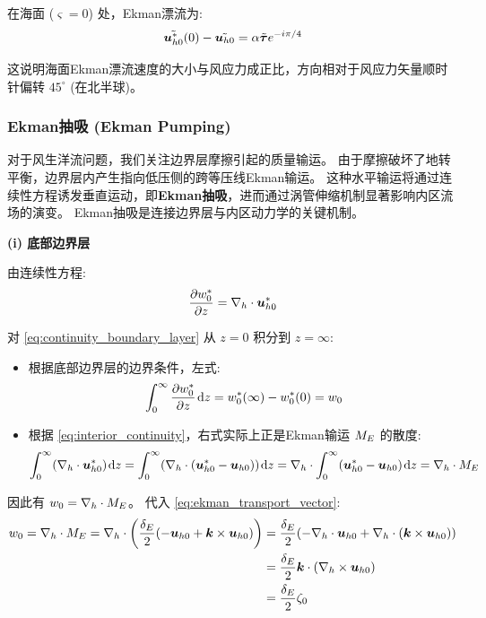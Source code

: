在海面 ($\varsigma=0$) 处，Ekman漂流为:
\begin{equation}
    \tilde{\bm{u}_{h0}^*}(0) - \tilde{\bm{u}_{h0}} = \alpha \tilde{{\bm{\tau}}} e^{-i \pi/4}
    \label{eq:surface_velocity_boundary_top}
\end{equation}

这说明海面Ekman漂流速度的大小与风应力成正比，方向相对于风应力矢量顺时针偏转 $45^\circ$ (在北半球)。

\subsubsection{Ekman抽吸 (Ekman Pumping)}

对于风生洋流问题，我们关注边界层摩擦引起的质量输运。
由于摩擦破坏了地转平衡，边界层内产生指向低压侧的跨等压线Ekman输运。
这种水平输运将通过连续性方程诱发垂直运动，即\textbf{Ekman抽吸}，进而通过涡管伸缩机制显著影响内区流场的演变。
Ekman抽吸是连接边界层与内区动力学的关键机制。

\textbf{(i) 底部边界层}

由连续性方程:
\begin{equation}
    \pde{\flayer{w_0}}{z} = \nabla_h \cdot \flayer{\vel_{h0}}
    \label{eq:continuity_boundary_layer}
\end{equation}

对 \eqref{eq:continuity_boundary_layer} 从 $z = 0$ 积分到 $z = \infty$:
\begin{itemize}
    \item 根据底部边界层的边界条件，左式:
    \begin{equation*}
        \int_0^\infty \pde{\flayer{w_0}}{z} \dd{z} = \flayer{w_0}(\infty) - \flayer{w_0}(0) = w_0
    \end{equation*}

    \item 根据 \eqref{eq:interior_continuity}，右式实际上正是Ekman输运 $M_E$ 的散度:
    \begin{equation*}
        \int_0^\infty (\nabla_h \cdot \bm{u}_{h0}^*) \mkern2mu \mathrm{d} z = \int_0^\infty (\nabla_h \cdot (\bm{u}_{h0}^* - \bm{u}_{h0})) \mkern2mu \mathrm{d} z = \nabla_h \cdot \int_0^\infty (\bm{u}_{h0}^* - \bm{u}_{h0}) \mkern2mu \mathrm{d} z = \nabla_h \cdot M_E
    \end{equation*}
\end{itemize}

因此有 $w_0 = \nabla_h \cdot M_E$。
代入 \eqref{eq:ekman_transport_vector}:
\begin{align*}
    w_0 = \nabla_h \cdot M_E = \nabla_h \cdot \left(\frac{\delta_E}{2} (-\bm{u}_{h0} + \bm{k} \times \bm{u}_{h0})\right) &= \frac{\delta_E}{2} (-\nabla_h \cdot \bm{u}_{h0} + \nabla_h \cdot (\bm{k} \times \bm{u}_{h0})) \\
    &= \frac{\delta_E}{2} \bm{k} \cdot (\nabla_h \times \bm{u}_{h0}) \\
    &= \frac{\delta_E}{2} \zeta_0
\end{align*}

